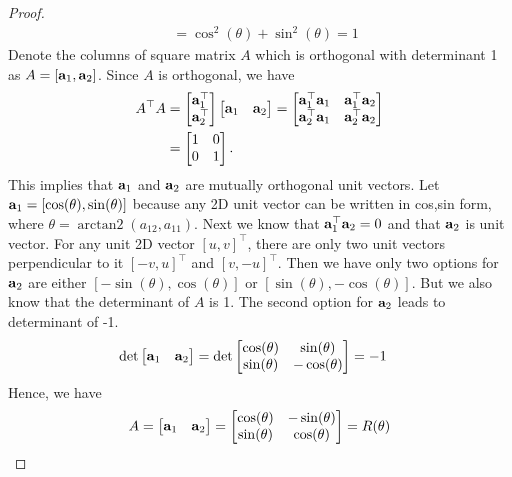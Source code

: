 \documentclass{article}
\DeclareMathOperator{\atantwo}{arctan2}
\begin{document}
\begin{proof}
\begin{align}
              &= \cos^2(\theta)+  \sin^2(\theta)  = 1
      \end{align}
  Denote the columns of square matrix $A$ which  is orthogonal with determinant
  1 as $A = [\mathbf{a}_1, \mathbf{a}_2]$. Since $A$ is orthogonal,  we have
  \begin{align}
    A^\top A
    &= \begin{bmatrix}
      \mathbf{a}_1^\top  \\   \mathbf{a}_2^\top
    \end{bmatrix}
    \begin{bmatrix}
      \mathbf{a}_1  &   \mathbf{a}_2
    \end{bmatrix}  = \begin{bmatrix} \mathbf{a}_1^\top \mathbf{a}_1  & \mathbf{a}_1^\top \mathbf{a}_2
      \\
      \mathbf{a}_2^\top \mathbf{a}_1 & \mathbf{a}_2^\top \mathbf{a}_2\end{bmatrix}
      \notag\\
    &= \begin{bmatrix} 1  &  0   \\  0  &  1 \end{bmatrix}.
  \end{align}
  This   implies that $\mathbf{a}_1$  and  $\mathbf{a}_2$ are mutually orthogonal unit
  vectors. Let $\mathbf{a}_1  = [\cos(\theta), \sin(\theta)]$ because any 2D unit
  vector can  be written in cos,sin form, where $\theta = \atantwo(a_{12}, a_{11})$.
  Next we know  that  $\mathbf{a}_1^\top\mathbf{a}_2 =  0$ and that $\mathbf{a}_2$ is unit  vector.
  For any  unit 2D vector   $[u, v]^\top$, there are only two unit vectors
  perpendicular to it $[-v, u]^\top$ and $[v, -u]^\top$.
  Then we have only two
  options for $\mathbf{a}_2$  are  either $[-\sin(\theta), \cos(\theta)]$ or
  $[\sin(\theta), -\cos(\theta)]$.  But we also  know that the determinant of
  $A$ is  1. The second option   for $\mathbf{a}_2$ leads to determinant of -1.
  \begin{align}
    \det\begin{bmatrix}
      \mathbf{a}_1  &  \mathbf{a}_2
      \end{bmatrix}
    &=  
      \det\begin{bmatrix}
        \cos(\theta)  &  \sin(\theta)\\
        \sin(\theta) &  -\cos(\theta)
      \end{bmatrix} = -1
    \end{align}
    Hence, we have
    \[
      A = \begin{bmatrix}
        \mathbf{a}_1  &  \mathbf{a}_2
      \end{bmatrix}
      =  
      \begin{bmatrix}
        \cos(\theta)  &  -\sin(\theta)\\
        \sin(\theta) &  \cos(\theta)
      \end{bmatrix} = R(\theta) \]

\end{proof}
\end{document}
